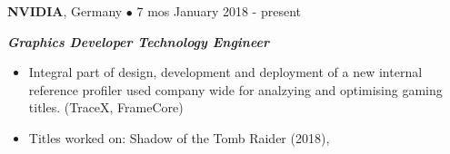 \textbf{NVIDIA}, Germany $\bullet$ 7 mos \hfill January 2018 - present

\textbf{\textit{Graphics Developer Technology Engineer}}
\begin{itemize}
	\item Integral part of design, development and deployment of a new internal reference profiler used company wide for analzying and optimising gaming titles. (TraceX, FrameCore)
    \item Titles worked on: Shadow of the Tomb Raider (2018), 
\end{itemize}
